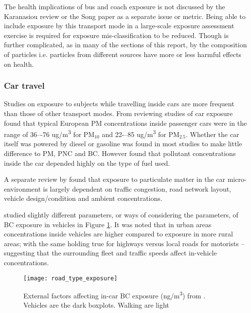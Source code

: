 The health implications of bus and coach exposure is not discussed by the Karanasiou review or the Song paper as a separate issue or metric. Being able to include exposure by this transport mode in a large-scale exposure assessment exercise is required for exposure mis-classification to be reduced. Though is further complicated, as in many of the sections of this report, by the composition of particles i.e. particles from different sources have more or less harmful effects on health.


\subsubsection{Car travel}
\label{sec:car}

Studies on exposure to subjects while travelling inside cars are more frequent than those of other transport modes. From reviewing studies of car exposure \cite{Karanasiou2014} found that typical European PM concentrations inside passenger cars were in the range of 36–-76 ug/m\textsuperscript{3} for PM$_{10}$ and 22-–85 ug/m\textsuperscript{3} for PM$_{2.5}$. Whether the car itself was powered by diesel or gasoline was found in most studies to make little difference to PM, PNC and BC. However \cite{Jalava2012} found that pollutant concentrations inside the car depended highly on the type of fuel used.

A separate review by \cite{Nasir2009} found that exposure to particulate matter in the car micro-environment is largely dependent on traffic congestion, road network layout, vehicle design/condition and ambient concentrations.

\cite{Dons2013} studied slightly different parameters, or ways of considering the parameters, of BC exposure in vehicles in Figure \ref{fig:road_type_exposure}. It was noted that in urban areas concentrations inside vehicles are higher compared to exposure in more rural areas; with the same holding true for highways versus local roads for motorists -- suggesting that the surrounding fleet and traffic speeds affect in-vehicle concentrations.

\begin{figure}[H]
\centering
\texttt{[image: road\_type\_exposure]}
\caption{External factors affecting in-car BC exposure (ng/m\textsuperscript{3}) from \cite{Dons2013}. Vehicles are the dark boxplots. Walking are light}
\label{fig:road_type_exposure}
\end{figure}

